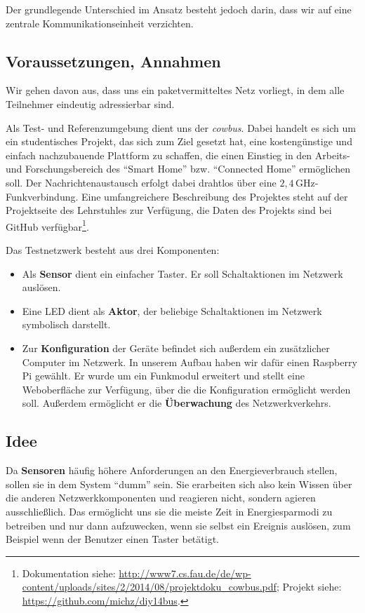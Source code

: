 \documentclass{IEEEtran}
\begin{document}
    Der grundlegende Unterschied im Ansatz besteht jedoch darin,
    dass wir auf eine zentrale Kommunikationseinheit verzichten.

    \subsection{Voraussetzungen, Annahmen}
        Wir gehen davon aus, dass uns ein paketvermitteltes Netz vorliegt,
        in dem alle Teilnehmer eindeutig adressierbar sind.

        Als Test- und Referenzumgebung dient uns der \emph{cowbus}.
        Dabei handelt es sich um ein studentisches Projekt,
        das sich zum Ziel gesetzt hat,
        eine kostengünstige und einfach nachzubauende Plattform zu schaffen,
        die einen Einstieg in den Arbeits- und Forschungsbereich des
        \enquote{Smart Home} bzw. \enquote{Connected Home} ermöglichen soll.
        Der Nachrichtenaustausch erfolgt dabei drahtlos über eine
        $2,4$\,GHz-Funkverbindung. Eine umfangreichere Beschreibung des Projektes
        steht auf der Projektseite des Lehrstuhles zur Verfügung,
        die Daten des Projekts sind bei GitHub
        verfügbar\footnote{Dokumentation siehe: \url{http://www7.cs.fau.de/de/wp-content/uploads/sites/2/2014/08/projektdoku_cowbus.pdf}; Projekt siehe: \url{https://github.com/michz/diy14bus}.}.

        Das Testnetzwerk besteht aus drei Komponenten:
        \begin{itemize}
            \item Als \textbf{Sensor} dient ein einfacher Taster.
                Er soll Schaltaktionen im Netzwerk auslösen.
            \item Eine LED dient als \textbf{Aktor},
                der beliebige Schaltaktionen im Netzwerk symbolisch darstellt.
            \item Zur \textbf{Konfiguration} der Geräte befindet sich
                außerdem ein zusätzlicher Computer im Netzwerk.
                In unserem Aufbau haben wir dafür einen Raspberry Pi gewählt.
                Er wurde um ein Funkmodul erweitert und stellt eine
                Weboberfläche zur Verfügung,
                über die die Konfiguration ermöglicht werden soll.
                Außerdem ermöglicht er die \textbf{Überwachung} des Netzwerkverkehrs.
        \end{itemize}

    \subsection{Idee}
        Da \textbf{Sensoren} häufig höhere Anforderungen an den Energieverbrauch
        stellen, sollen sie in dem System \enquote{dumm} sein.
        Sie erarbeiten sich also kein Wissen über die anderen Netzwerkkomponenten
        und reagieren nicht, sondern agieren ausschließlich.
        Das ermöglicht uns sie die meiste Zeit in Energiesparmodi zu betreiben
        und nur dann aufzuwecken, wenn sie selbst ein Ereignis auslösen,
        zum Beispiel wenn der Benutzer einen Taster betätigt.
\end{document}
